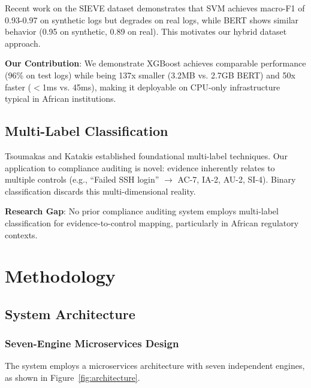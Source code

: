\documentclass[11pt,conference]{IEEEtran}
\begin{document}
Recent work on the SIEVE dataset \cite{sieve_dataset} demonstrates that SVM achieves macro-F1 of 0.93-0.97 on synthetic logs but degrades on real logs, while BERT shows similar behavior (0.95 on synthetic, 0.89 on real). This motivates our hybrid dataset approach.

\textbf{Our Contribution}: We demonstrate XGBoost achieves comparable performance (96\% on test logs) while being 137x smaller (3.2MB vs. 2.7GB BERT) and 50x faster ($<$1ms vs. 45ms), making it deployable on CPU-only infrastructure typical in African institutions.

\subsection{Multi-Label Classification}

Tsoumakas and Katakis \cite{tsoumakas2007} established foundational multi-label techniques. Our application to compliance auditing is novel: evidence inherently relates to multiple controls (e.g., ``Failed SSH login'' $\rightarrow$ AC-7, IA-2, AU-2, SI-4). Binary classification discards this multi-dimensional reality.

\textbf{Research Gap}: No prior compliance auditing system employs multi-label classification for evidence-to-control mapping, particularly in African regulatory contexts.

\section{Methodology}

\subsection{System Architecture}

\subsubsection{Seven-Engine Microservices Design}

The system employs a microservices architecture with seven independent engines, as shown in Figure~\ref{fig:architecture}.
\end{document}
